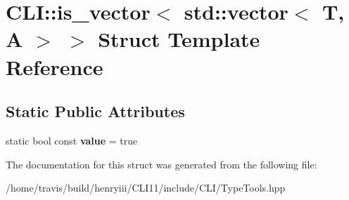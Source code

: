 \hypertarget{struct_c_l_i_1_1is__vector_3_01std_1_1vector_3_01_t_00_01_a_01_4_01_4}{}\section{C\+LI\+:\+:is\+\_\+vector$<$ std\+:\+:vector$<$ T, A $>$ $>$ Struct Template Reference}
\label{struct_c_l_i_1_1is__vector_3_01std_1_1vector_3_01_t_00_01_a_01_4_01_4}
\subsection*{Static Public Attributes}
\begin{DoxyCompactItemize}
\item 
\mbox{\label{struct_c_l_i_1_1is__vector_3_01std_1_1vector_3_01_t_00_01_a_01_4_01_4_a3f57ff1f33bc35ee4d817047932307f0}} 
static bool const {\bfseries value} = true
\end{DoxyCompactItemize}


The documentation for this struct was generated from the following file\+:\begin{DoxyCompactItemize}
\item 
/home/travis/build/henryiii/\+C\+L\+I11/include/\+C\+L\+I/Type\+Tools.\+hpp\end{DoxyCompactItemize}
